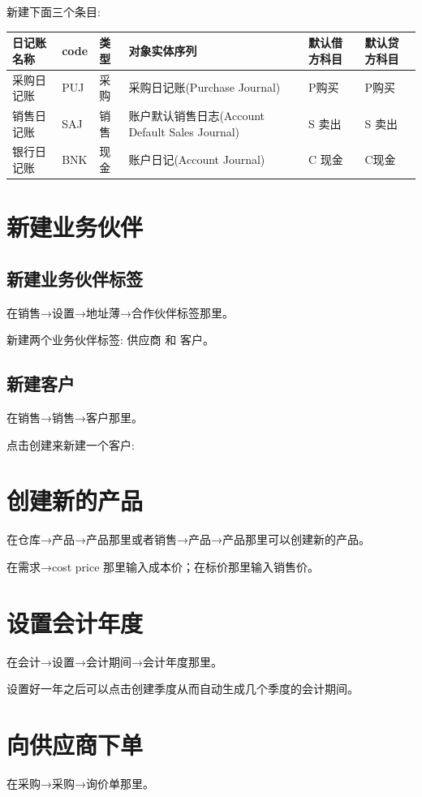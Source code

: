 \documentclass[11pt,a4paper]{sphinxmanual}
\begin{document}
新建下面三个条目:
\begin{center}
\begin{tabular}{llllll}
\toprule
日记账名称 & code & 类型 & 对象实体序列 & 默认借方科目 & 默认贷方科目\\
\midrule
采购日记账 & PUJ & 采购 & 采购日记账(Purchase Journal) & P购买 & P购买\\
销售日记账 & SAJ & 销售 & 账户默认销售日志(Account Default Sales Journal) & S 卖出 & S 卖出\\
银行日记账 & BNK & 现金 & 账户日记(Account Journal) & C 现金 & C现金\\
\bottomrule
\end{tabular}
\end{center}


\section{新建业务伙伴}
\label{sec-13-7}

\subsection{新建业务伙伴标签}
\label{sec-13-7-1}
在销售→设置→地址薄→合作伙伴标签那里。

新建两个业务伙伴标签: 供应商 和 客户。


\subsection{新建客户}
\label{sec-13-7-2}
在销售→销售→客户那里。

点击创建来新建一个客户:


\section{创建新的产品}
\label{sec-13-8}
在仓库→产品→产品那里或者销售→产品→产品那里可以创建新的产品。

在需求→cost price 那里输入成本价；在标价那里输入销售价。


\section{设置会计年度}
\label{sec-13-9}
在会计→设置→会计期间→会计年度那里。


设置好一年之后可以点击创建季度从而自动生成几个季度的会计期间。


\section{向供应商下单}
\label{sec-13-10}
在采购→采购→询价单那里。
\end{document}
